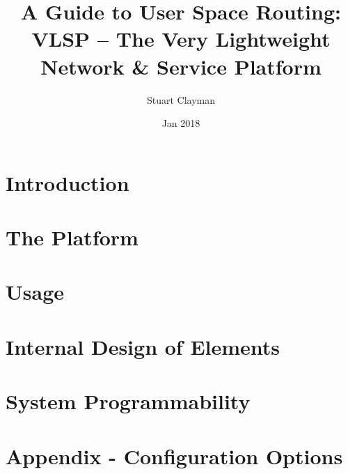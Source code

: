 \documentclass[a4paper, 11pt, twoside]{memoir}
\renewcommand{\appendix}[1]{%
   \newpage \section{#1}%
}
\begin{document}
\frontmatter

\title{A Guide to User Space Routing: \\
VLSP -- The Very Lightweight Network \& Service Platform}
\date{Jan 2018}
\author{Stuart Clayman}

\begin{titlingpage} 
\maketitle 
\end{titlingpage}




\clearpage
\tableofcontents

\mainmatter

\chapter{Introduction}
\label{chap:intro}


\chapter{The Platform}
\label{chap:platform}


\chapter{Usage}
\label{chap:usage}


\chapter{Internal Design of Elements}
\label{chap:design}


\chapter{System Programmability}
\label{chap:programmability}


%


\chapter{Appendix - Configuration Options}
\label{chap:config}

\end{document}

